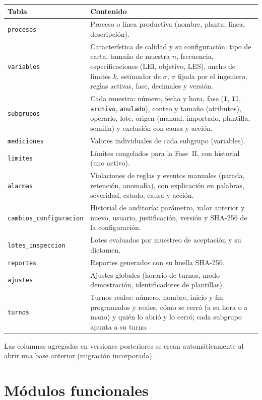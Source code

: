 \documentclass[11pt,a4paper]{article}
\begin{document}
\begin{tabularx}{\linewidth}{@{}P{4.2cm}L@{}}
\toprule
\textbf{Tabla} & \textbf{Contenido}\\
\midrule
\texttt{procesos} & Proceso o línea productiva (nombre, planta, línea, descripción).\\
\texttt{variables} & Característica de calidad y su configuración: tipo de carta, tamaño de muestra $n$, frecuencia, especificaciones (LEI, objetivo, LES), ancho de límites $k$, estimador de $\sigma$, $\sigma$ fijada por el ingeniero, reglas activas, fase, decimales y versión.\\
\texttt{subgrupos} & Cada muestra: número, fecha y hora, fase (\texttt{I}, \texttt{II}, \texttt{archivo}, \texttt{anulado}), conteo y tamaño (atributos), operario, lote, origen (manual, importado, plantilla, semilla) y exclusión con causa y acción.\\
\texttt{mediciones} & Valores individuales de cada subgrupo (variables).\\
\texttt{limites} & Límites congelados para la Fase~II, con historial (uno activo).\\
\texttt{alarmas} & Violaciones de reglas y eventos manuales (parada, retención, anomalía), con explicación en palabras, severidad, estado, causa y acción.\\
\texttt{cambios\_configuracion} & Historial de auditoría: parámetro, valor anterior y nuevo, usuario, justificación, versión y SHA-256 de la configuración.\\
\texttt{lotes\_inspeccion} & Lotes evaluados por muestreo de aceptación y su dictamen.\\
\texttt{reportes} & Reportes generados con su huella SHA-256.\\
\texttt{ajustes} & Ajustes globales (horario de turnos, modo demostración, identificadores de plantillas).\\
\texttt{turnos} & Turnos reales: número, nombre, inicio y fin programados y reales, cómo se cerró (a su hora o a mano) y quién lo abrió y lo cerró; cada subgrupo apunta a su turno.\\
\bottomrule
\end{tabularx}

Las columnas agregadas en versiones posteriores se crean automáticamente al abrir una base
anterior (migración incorporada).

\section{Módulos funcionales}
\end{document}
